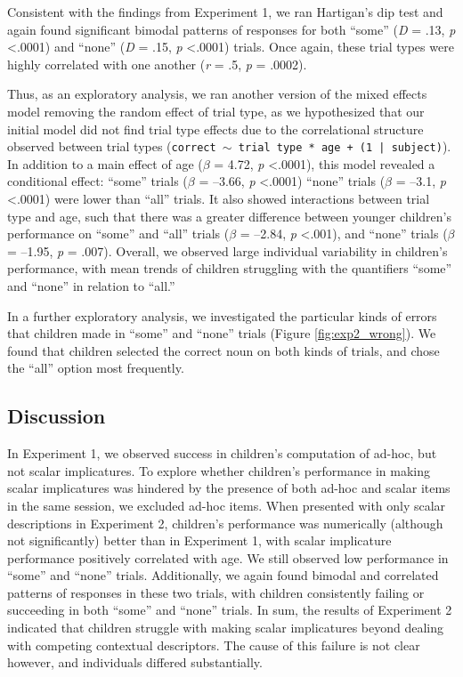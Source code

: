 \documentclass[man]{apa2}
\begin{document}
Consistent with the findings from Experiment 1, we ran Hartigan's dip test and again found significant bimodal patterns of responses for both ``some'' (\textit{D} = .13, \textit{p} \textless  .0001) and ``none'' (\textit{D} = .15, \textit{p} \textless  .0001) trials. Once again, these trial types were highly correlated with one another (\textit{r} = .5, \textit{p} = .0002).

Thus, as an exploratory analysis, we ran another version of the mixed effects model removing the random effect of trial type, as we hypothesized that our initial model did not find trial type effects due to the correlational structure observed between trial types ({\tt{correct $\sim$ trial type * age + (1 | subject)}}). In addition to a main effect of age ($\beta$ = 4.72, \textit{p} \textless .0001), this model revealed a conditional effect: ``some'' trials ($\beta$ = --3.66, \emph{p} \textless .0001) ``none'' trials ($\beta$ = --3.1, \emph{p} \textless .0001) were lower than ``all'' trials. It also showed interactions between trial type and age, such that there was a greater difference between younger children's performance on ``some'' and ``all'' trials ($\beta$ = --2.84, \textit{p} \textless  .001), and ``none'' trials ($\beta$ = --1.95, \textit{p} = .007). Overall, we observed large individual variability in children's performance, with mean trends of children struggling with the quantifiers ``some'' and ``none'' in relation to ``all.''

In a further exploratory analysis, we investigated the particular kinds of errors that children made in ``some'' and ``none'' trials (Figure \ref{fig:exp2_wrong}). We found that children selected the correct noun on both kinds of trials, and chose the ``all'' option most frequently.

\subsection{Discussion}

In Experiment 1, we observed success in children's computation of ad-hoc, but not scalar implicatures. To explore whether children's performance in making scalar implicatures was hindered by the presence of both ad-hoc and scalar items in the same session, we excluded ad-hoc items. When presented with only scalar descriptions in Experiment 2, children's performance was numerically (although not significantly) better than in Experiment 1, with scalar implicature performance positively correlated with age. We still observed low performance in ``some'' and ``none'' trials. Additionally, we again found bimodal and correlated patterns of responses in these two trials, with children consistently failing or succeeding in both ``some'' and ``none'' trials. In sum, the results of Experiment 2 indicated that children struggle with making scalar implicatures beyond dealing with competing contextual descriptors. The cause of this failure is not clear however, and individuals differed substantially.
\end{document}
